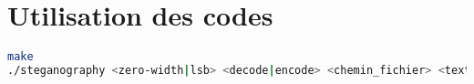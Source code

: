 \newpage
\section{Utilisation des codes}
\begin{lstlisting}[language=bash,
breaklines,
rulecolor=\color{black},
frame=single]
make
./steganography <zero-width|lsb> <decode|encode> <chemin_fichier> <texte_optionnel>
\end{lstlisting}